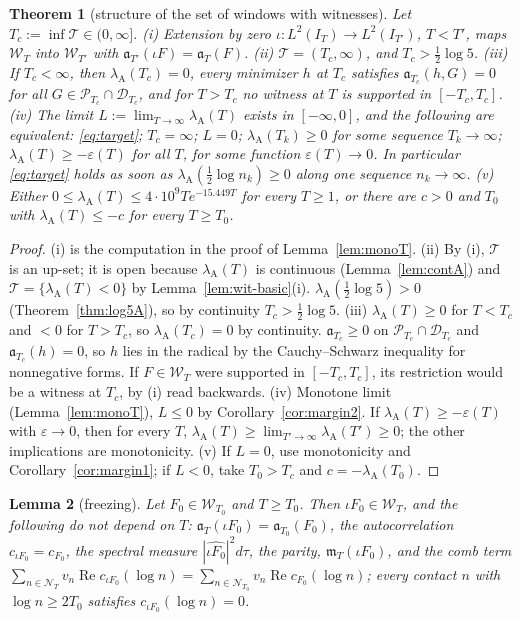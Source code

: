 \documentclass[11pt]{amsart}
\newtheorem{theorem}{Theorem}[section]
\newtheorem{lemma}[theorem]{Lemma}
\theoremstyle{definition}
\theoremstyle{remark}
\newcommand{\Rel}{\operatorname{Re}}
\newcommand{\IT}{I_T}
\newcommand{\lamA}{\lambda_{\mathrm A}(T)}
\newcommand{\mT}{\mathfrak m_T}
\begin{document}
\begin{theorem}[structure of the set of windows with witnesses]\label{thm:wit-Tc}
Let $T_c:=\inf\mathscr T\in(0,\infty]$.
\emph{(i)} Extension by zero $\iota:L^2(\IT)\to L^2(I_{T'})$, $T<T'$, maps $\mathscr W_T$ into $\mathscr W_{T'}$ with
$\mathfrak a_{T'}(\iota F)=\mathfrak a_T(F)$.
\emph{(ii)} $\mathscr T=(T_c,\infty)$, and $T_c>\frac12\log5$.
\emph{(iii)} If $T_c<\infty$, then $\lambda_{\mathrm A}(T_c)=0$, every minimizer $h$ at $T_c$ satisfies
$\mathfrak a_{T_c}(h,G)=0$ for all $G\in\mathcal P_{T_c}\cap\mathcal D_{T_c}$, and for $T>T_c$ no witness at $T$ is supported in
$[-T_c,T_c]$.
\emph{(iv)} The limit $L:=\lim_{T\to\infty}\lamA$ exists in $[-\infty,0]$, and the following are equivalent:
\eqref{eq:target}; $T_c=\infty$; $L=0$; $\lambda_{\mathrm A}(T_k)\ge0$ for some sequence $T_k\to\infty$;
$\lamA\ge-\varepsilon(T)$ for all $T$, for some function $\varepsilon(T)\to0$. In particular \eqref{eq:target} holds as
soon as $\lambda_{\mathrm A}(\frac12\log n_k)\ge0$ along one sequence $n_k\to\infty$.
\emph{(v)} Either $0\le\lamA\le4\cdot10^9Te^{-15.449T}$ for every $T\ge1$, or there are $c>0$ and $T_0$ with
$\lamA\le-c$ for every $T\ge T_0$.
\end{theorem}

\begin{proof}
(i) is the computation in the proof of Lemma~\ref{lem:monoT}. (ii) By (i), $\mathscr T$ is an up-set; it is open
because $\lamA$ is continuous (Lemma~\ref{lem:contA}) and $\mathscr T=\{\lamA<0\}$ by
Lemma~\ref{lem:wit-basic}(i). $\lambda_{\mathrm A}(\frac12\log5)>0$ (Theorem~\ref{thm:log5A}), so by continuity
$T_c>\frac12\log5$. (iii) $\lamA\ge0$ for $T<T_c$ and $<0$ for $T>T_c$, so $\lambda_{\mathrm A}(T_c)=0$ by continuity.
$\mathfrak a_{T_c}\ge0$ on $\mathcal P_{T_c}\cap\mathcal D_{T_c}$ and $\mathfrak a_{T_c}(h)=0$, so $h$ lies in the radical by the
Cauchy--Schwarz inequality for nonnegative forms. If $F\in\mathscr W_T$ were supported in $[-T_c,T_c]$, its restriction
would be a witness at $T_c$, by (i) read backwards. (iv) Monotone limit (Lemma~\ref{lem:monoT}), $L\le0$ by
Corollary~\ref{cor:margin2}. If $\lamA\ge-\varepsilon(T)$ with $\varepsilon\to0$, then for every $T$,
$\lamA\ge\lim_{T'\to\infty}\lambda_{\mathrm A}(T')\ge0$; the other implications are monotonicity. (v) If $L=0$, use
monotonicity and Corollary~\ref{cor:margin1}; if $L<0$, take $T_0>T_c$ and $c=-\lambda_{\mathrm A}(T_0)$.
\end{proof}

\begin{lemma}[freezing]\label{lem:wit-freeze}
Let $F_0\in\mathscr W_{T_0}$ and $T\ge T_0$. Then $\iota F_0\in\mathscr W_T$, and the following do not depend on $T$:
$\mathfrak a_T(\iota F_0)=\mathfrak a_{T_0}(F_0)$, the autocorrelation $c_{\iota F_0}=c_{F_0}$, the spectral measure
$|\widehat{\iota F_0}|^2d\tau$, the parity, $\mT(\iota F_0)$, and the comb term
$\sum_{n\in\mathcal N_T}v_n\Rel c_{\iota F_0}(\log n)=\sum_{n\in\mathcal N_{T_0}}v_n\Rel c_{F_0}(\log n)$; every contact $n$ with
$\log n\ge2T_0$ satisfies $c_{\iota F_0}(\log n)=0$.
\end{lemma}
\end{document}

